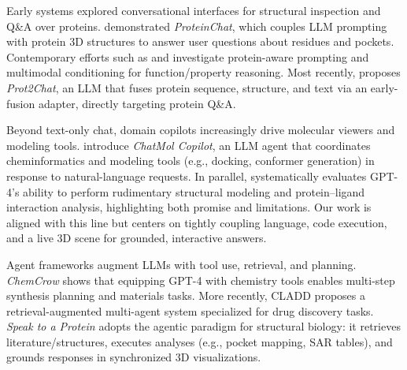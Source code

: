 \documentclass{article}
\begin{document}
Early systems explored conversational interfaces for structural inspection and Q\&A over proteins. \citet{guo2023proteinchat} demonstrated \emph{ProteinChat}, which couples LLM prompting with protein 3D structures to answer user questions about residues and pockets. Contemporary efforts such as \citet{wang2024protchatgpt} and \citet{xiao2024proteingpt} investigate protein-aware prompting and multimodal conditioning for function/property reasoning. Most recently, \citet{wang2025prot2chat} proposes \emph{Prot2Chat}, an LLM that fuses protein sequence, structure, and text via an early-fusion adapter, directly targeting protein Q\&A.

Beyond text-only chat, domain copilots increasingly drive molecular viewers and modeling tools. \citet{sun2024chatmol} introduce \emph{ChatMol Copilot}, an LLM agent that coordinates cheminformatics and modeling tools (e.g., docking, conformer generation) in response to natural-language requests. In parallel, \citet{ille2024gpt4structural} systematically evaluates GPT-4's ability to perform rudimentary structural modeling and protein–ligand interaction analysis, highlighting both promise and limitations. Our work is aligned with this line but centers on tightly coupling language, code execution, and a live 3D scene for grounded, interactive answers.

Agent frameworks augment LLMs with tool use, retrieval, and planning. \emph{ChemCrow} \citep{bran2024chemcrow} shows that equipping GPT-4 with chemistry tools enables multi-step synthesis planning and materials tasks. More recently, CLADD \citep{lee2025cladd} proposes a retrieval-augmented multi-agent system specialized for drug discovery tasks. \emph{Speak to a Protein} adopts the agentic paradigm for structural biology: it retrieves literature/structures, executes analyses (e.g., pocket mapping, SAR tables), and grounds responses in synchronized 3D visualizations.
\end{document}
